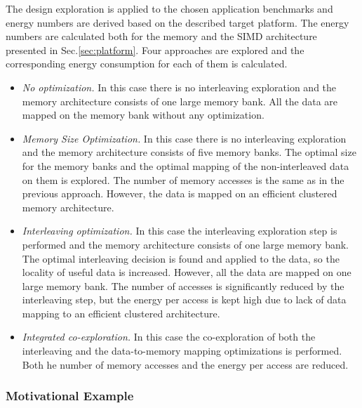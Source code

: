 \documentclass[prodmode,acmtecs]{acmsmall}
\begin{document}
The design exploration is applied to the chosen application benchmarks and energy numbers are derived based on the described target platform.
The energy numbers are calculated both for the memory and the SIMD architecture presented in Sec.\ref{sec:platform}.
Four approaches are explored and the corresponding energy consumption for each of them is calculated.

\begin{itemize}
\item \textit{No optimization.} 
In this case there is no interleaving exploration and the memory architecture consists of one large memory bank. All the data are mapped on the memory bank without any optimization. 
\item \textit{Memory Size Optimization.} 
In this case there is no interleaving exploration and the memory architecture consists of five memory banks.
The optimal size for the memory banks and the optimal mapping of the non-interleaved data on them is explored. 
The number of memory accesses is the same as in the previous approach.
However, the data is mapped on an efficient clustered memory architecture.
\item \textit{Interleaving optimization.} 
In this case the  interleaving exploration step is performed and the memory architecture consists of one large memory bank.
The optimal interleaving decision is found and applied to the data, so the locality of useful data is increased.
However, all the data are mapped on one large memory bank.
The number of accesses is significantly reduced by the interleaving step, but the energy per access is kept high due to lack of data mapping to an efficient clustered architecture.
\item \textit{Integrated co-exploration.} 
In this case the co-exploration of both the interleaving and the data-to-memory mapping optimizations is performed.
Both he number of memory accesses and the energy per access are reduced.
\end{itemize}

\subsubsection{Motivational Example}
\end{document}
